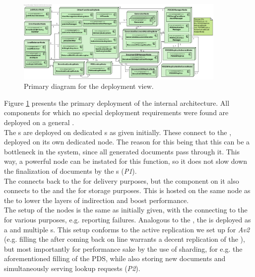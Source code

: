 \begin{figure}
    \centering
    \includegraphics[width=0.9\textwidth]{figures/Deployment.png}
    \caption{Primary diagram for the deployment view.}\label{fig:depl_primary}
\end{figure}


\noindent Figure \ref{fig:depl_primary} presents the primary deployment of the internal architecture. All components for which no special deployment requirements were found are deployed on a general .\\
The s are deployed on dedicated s as given initially. These connect to the , deployed on its own dedicated node. The reason for this being that this  can be a bottleneck in the system, since all generated documents pass through it. This way, a powerful node can be instated for this function, so it does not slow down the finalization of documents by the s (\emph{P1}).\\
The  connects back to the  for delivery purposes, but the  component on it also connects to the  and the  for storage purposes. This  is hosted on the same node as the  to lower the layers of indirection and boost performance.\\
The setup of the  nodes is the same as initially given, with the  connecting to the  for various purposes, e.g. reporting  failures.
Analogous to the , the  is deployed as a  and multiple s. This setup conforms to the active replication we set up for \emph{Av2} (e.g. filling the  after coming back on line warrants a decent replication of the ), but most importantly for performance sake by the use of sharding, for e.g. the aforementioned filling of the PDS, while also storing new documents and simultaneously serving lookup requests (\emph{P2}).\\
